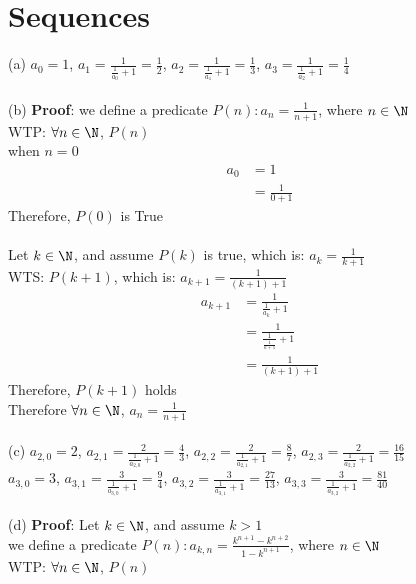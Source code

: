 \documentclass[12pt]{article}
\begin{document}
\section{Sequences}
(a) $a_0 = 1$, $a_1 = \frac{1}{\frac{1}{a_0} + 1} = \frac{1}{2}$, $a_2 = \frac{1}{\frac{1}{a_1} + 1} = \frac{1}{3}$, $a_3 = \frac{1}{\frac{1}{a_2} + 1} = \frac{1}{4}$\\
\\
(b) \textbf{Proof}: we define a predicate $P(n): a_n = \frac{1}{n + 1}$, where $n \in \N$\\
WTP: $\forall n \in \N$, $P(n)$\\
\base\quad when $n = 0$
\begin{align*}
    \tag{by the definition of sequences}
    a_0 &= 1\\
    \tag{left side equals to right side}
    &= \frac{1}{0 + 1}
\end{align*}
Therefore, $P(0)$ is True\\
\\
\istep\quad Let $k \in \N$, and assume $P(k)$ is true, which is: $a_k = \frac{1}{k + 1}$\\
WTS: $P(k+1)$, which is: $a_{k+1} = \frac{1}{(k+1) + 1}$
\begin{align*}
    \tag{by the definition of sequences}
    a_{k+1} &= \frac{1}{\frac{1}{a_k} + 1}\\
    \tag{by induction hypothesis}
    &= \frac{1}{\frac{1}{\frac{1}{k + 1}} + 1}\\
    &= \frac{1}{(k + 1) + 1}
\end{align*}
Therefore, $P(k+1)$ holds\\
Therefore $\forall n \in \N$, $a_n = \frac{1}{n + 1}$\\
\\
(c) $a_{2,0} = 2$, $a_{2,1} = \frac{2}{\frac{1}{a_{2,0}} + 1} = \frac{4}{3}$, $a_{2,2} = \frac{2}{\frac{1}{a_{2,1}} + 1} = \frac{8}{7}$, $a_{2,3} = \frac{2}{\frac{1}{a_{2,2}} + 1} = \frac{16}{15}$\\
$a_{3,0} = 3$, $a_{3,1} = \frac{3}{\frac{1}{a_{3,0}} + 1} = \frac{9}{4}$, $a_{3,2} = \frac{3}{\frac{1}{a_{3,1}} + 1} = \frac{27}{13}$, $a_{3,3} = \frac{3}{\frac{1}{a_{3,2}} + 1} = \frac{81}{40}$\\
\\
(d) \textbf{Proof}: Let $k \in \N$, and assume $k > 1$\\
we define a predicate $P(n): a_{k,n} = \frac{k^{n + 1} - k^{n + 2}}{1 - k^{n + 1}}$, where $n \in \N$\\
WTP: $\forall n \in \N$, $P(n)$\\
\end{document}
